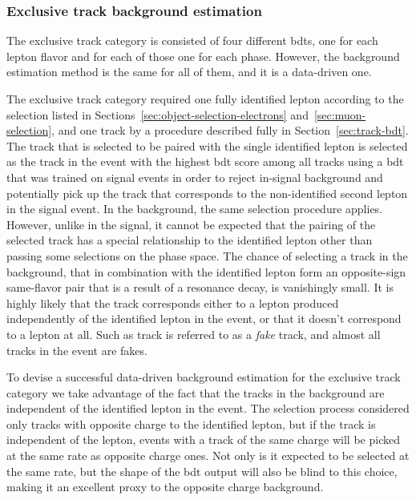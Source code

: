 \clearpage
\subsubsection{Exclusive track background estimation}
\label{sec:ex-track-background-estimation}

The exclusive track category is consisted of four different \glspl{bdt}, one for each lepton flavor and for each of those one for each phase. However, the background estimation method is the same for all of them, and it is a data-driven one.

The exclusive track category required one fully identified lepton according to the selection listed in Sections~\ref{sec:object-selection-electrons} and~\ref{sec:muon-selection}, and one track by a procedure described fully in Section~\ref{sec:track-bdt}. The track that is selected to be paired with the single identified lepton is selected as the track in the event with the highest \gls{bdt} score among all tracks using a \gls{bdt} that was trained on signal events in order to reject in-signal background and potentially pick up the track that corresponds to the non-identified second lepton in the signal event. In the background, the same selection procedure applies. However, unlike in the signal, it cannot be expected that the pairing of the selected track has a special relationship to the identified lepton other than passing some selections on the phase space. The chance of selecting a track in the background, that in combination with the identified lepton  form an opposite-sign same-flavor pair that is a result of a resonance decay, is vanishingly small. It is highly likely that the track corresponds either to a lepton produced independently of the identified lepton in the event, or that it doesn't correspond to a lepton at all. Such as track is referred to as a \emph{fake} track, and almost all tracks in the event are fakes.

To devise a successful data-driven background estimation for the exclusive track category we take advantage of the fact that the tracks in the background are independent of the identified lepton in the event. The selection process considered only tracks with opposite charge to the identified lepton, but if the track is independent of the lepton, events with a track of the same charge will be picked at the same rate as opposite charge ones. Not only is it expected to be selected at the same rate, but the shape of the \gls{bdt} output will also be blind to this choice, making it an excellent proxy to the opposite charge background.

